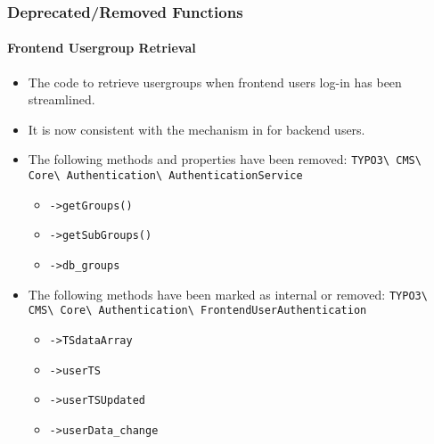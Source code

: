 %

\begin{frame}[fragile]
	\frametitle{Deprecated/Removed Functions}
	\framesubtitle{Frontend Usergroup Retrieval}

	\begin{itemize}
		\item The code to retrieve usergroups when frontend users log-in has been
			streamlined.
		\item It is now consistent with the mechanism in for backend users.
		\item The following methods and properties have been removed:\newline
			\smaller\texttt{TYPO3\textbackslash
				CMS\textbackslash
				Core\textbackslash
				Authentication\textbackslash
				AuthenticationService}\normalsize

			\begin{itemize}\smaller
				\item \texttt{->getGroups()}
				\item \texttt{->getSubGroups()}
				\item \texttt{->db\_groups}
			\end{itemize}\normalsize

		\item The following methods have been marked as internal or removed:\newline
			\smaller\texttt{TYPO3\textbackslash
				CMS\textbackslash
				Core\textbackslash
				Authentication\textbackslash
				FrontendUserAuthentication}\normalsize

			\begin{itemize}\smaller
				\item \texttt{->TSdataArray}
				\item \texttt{->userTS}
				\item \texttt{->userTSUpdated}
				\item \texttt{->userData\_change}
			\end{itemize}\normalsize

	\end{itemize}

\end{frame}

